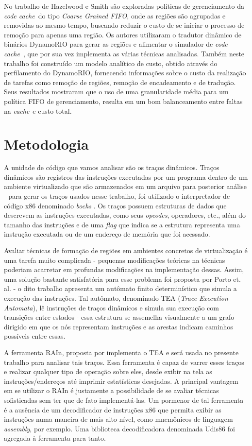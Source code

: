 \documentclass[12pt,twoside]{article}
\newcommand{\ccache}{\emph{code cache}}
\newcommand{\cache}{\emph{cache}}
\newcommand{\coarsefifo}{\emph{Coarse Grained FIFO}}
\begin{document}
No trabalho de Hazelwood e Smith \cite{kim-2004} são exploradas políticas de gerenciamento da \ccache~do tipo \coarsefifo, onde as regiões são agrupadas e removidas ao mesmo tempo, buscando reduzir o custo de se iniciar o processo de remoção para apenas uma região. Os autores utilizaram o tradutor dinâmico de binários DynamoRIO \cite{dynamorio-url} para gerar as regiões e alimentar o simulador de \ccache~, que por sua vez implementa as várias técnicas analisadas. Também neste trabalho foi construído um modelo analítico de custo, obtido através do perfilamento do DynamoRIO, fornecendo informações sobre o custo da realização de tarefas como remoção de regiões, remoção de encadeamento e de tradução. Seus resultados mostraram que o uso de uma granularidade média para um política FIFO de gerenciamento, resulta em um bom balanceamento entre faltas na \cache~e custo total.


\section{Metodologia}
\label{sec-metodologia}
A unidade de código que vamos analisar são os traços dinâmicos. Traços dinâmicos são registros das instruções executadas por um programa dentro de um ambiente virtualizado que são armazenados em um arquivo para posterior análise - para gerar os traços usados nesse trabalho, foi utilizado o interpretador de código x86 denominado \emph{bochs} \cite{bochs-url}. Os traços possuem estruturas de dados que descrevem as instruções executadas, como seus \emph{opcodes}, operadores, etc., além do tamanho das instruções e de uma \emph{flag} que indica se a estrutura representa uma instrução executada ou de um endereço de memória que foi acessado.

Avaliar técnicas de formação de regiões em ambientes concretos de virtualização é uma tarefa muito complicada - pequenas modificações teóricas na técnicas poderiam acarretar em profundas modificações na implementação dessas. Assim, uma solução bastante satisfatória para esse problema foi proposta por Porto et. al. \cite{guido-2012} - o dito trabalho apresenta um autômato finito determinístico que simula a execução das instruções. Tal autômato, denominado TEA (\emph{Trace Execution Automata}), lê instruções de traços dinâmicos e simula sua execução com transições entre estados - essa estrutura se assemelha visualmente a um grafo dirigido em que os nós representam instruções e as arestas indicam caminhos possíveis entre essas.

A ferramenta RAIn, proposta por \cite{thesis-zinsly} implementa o TEA e será usada no presente trabalho para analisar tais traços. Essa ferramenta é capaz de varrer esses traços e realizar qualquer tipo de operação sobre eles, desde exibir na tela as instruções/endereços até imprimir estatísticas desejadas. A principal vantagem em se utilizar o RAIn é justamente a possibilidade de se avaliar técnicas sofisticadas sem ter que de fato implementá-las. Um pormenor de tal ferramenta é a ausência de um decodificador de instruções x86 que permita exibir as instruções numa maneira de mais alto-nível, como mnemônicos de linguagem \emph{assembly}, por exemplo. Uma biblioteca decodificadora denominada Udis86 \cite{udis86-url} foi agregada à ferramenta para tanto.
\end{document}
